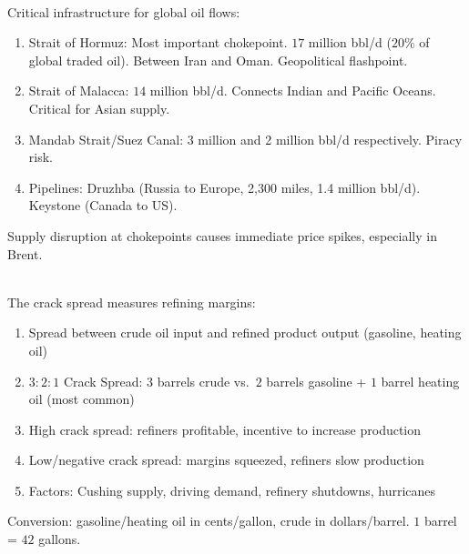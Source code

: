 \begin{remark} \\
Critical infrastructure for global oil flows:
\begin{enumerate}[label=\roman*.]
\setlength{\itemsep}{0pt}
\item Strait of Hormuz: Most important chokepoint. $17$ million bbl/d ($20\%$ of global traded oil). Between Iran and Oman. Geopolitical flashpoint.
\item Strait of Malacca: $14$ million bbl/d. Connects Indian and Pacific Oceans. Critical for Asian supply.
\item Mandab Strait/Suez Canal: 3 million and 2 million bbl/d respectively. Piracy risk.
\item Pipelines: Druzhba (Russia to Europe, 2,300 miles, 1.4 million bbl/d). Keystone (Canada to US).
\end{enumerate}
Supply disruption at chokepoints causes immediate price spikes, especially in Brent.
\end{remark}

\begin{remark} \\
The crack spread measures refining margins:
\begin{enumerate}[label=\roman*.]
\setlength{\itemsep}{0pt}
\item Spread between crude oil input and refined product output (gasoline, heating oil)
\item $3:2:1$ Crack Spread: $3$ barrels crude vs.\ $2$ barrels gasoline + $1$ barrel heating oil (most common)
\item High crack spread: refiners profitable, incentive to increase production
\item Low/negative crack spread: margins squeezed, refiners slow production
\item Factors: Cushing supply, driving demand, refinery shutdowns, hurricanes
\end{enumerate}
Conversion: gasoline/heating oil in cents/gallon, crude in dollars/barrel. $1$ barrel = $42$ gallons.
\end{remark}

